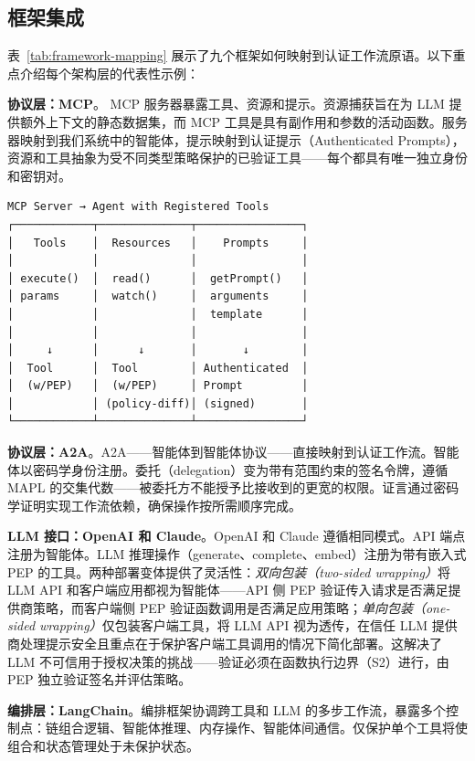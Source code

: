 \subsection{框架集成}
表~\ref{tab:framework-mapping} 展示了九个框架如何映射到认证工作流原语。以下重点介绍每个架构层的代表性示例：


\textbf{协议层：MCP}。
MCP 服务器暴露工具、资源和提示。资源捕获旨在为 LLM 提供额外上下文的静态数据集，而 MCP 工具是具有副作用和参数的活动函数。服务器映射到我们系统中的智能体，提示映射到认证提示（Authenticated Prompts）\cite{rajagopalan2025prompts}，资源和工具抽象为受不同类型策略保护的已验证工具——每个都具有唯一独立身份和密钥对。

\noindent\begin{minipage}[t]{\columnwidth}
{\scriptsize
\begin{verbatim}
MCP Server → Agent with Registered Tools
┌────────────┬──────────────┬────────────────┐
│   Tools    │  Resources   │    Prompts     │
│            │              │                │
│ execute()  │  read()      │  getPrompt()   │
│ params     │  watch()     │  arguments     │
│            │              │  template      │
│            │              │                │
│     ↓      │      ↓       │       ↓        │
│  Tool      │  Tool        │ Authenticated  │
│  (w/PEP)   │  (w/PEP)     │ Prompt         │
│            │ (policy-diff)│ (signed)       │
└────────────┴──────────────┴────────────────┘
\end{verbatim}}
\end{minipage}


\textbf{协议层：A2A}。A2A——智能体到智能体协议——直接映射到认证工作流。智能体以密码学身份注册。委托（delegation）变为带有范围约束的签名令牌，遵循 MAPL 的交集代数——被委托方不能授予比接收到的更宽的权限。证言通过密码学证明实现工作流依赖，确保操作按所需顺序完成。

\textbf{LLM 接口：OpenAI 和 Claude}。OpenAI 和 Claude 遵循相同模式。API 端点注册为智能体。LLM 推理操作（generate、complete、embed）注册为带有嵌入式 PEP 的工具。两种部署变体提供了灵活性：\textit{双向包装（two-sided wrapping）}将 LLM API 和客户端应用都视为智能体——API 侧 PEP 验证传入请求是否满足提供商策略，而客户端侧 PEP 验证函数调用是否满足应用策略；\textit{单向包装（one-sided wrapping）}仅包装客户端工具，将 LLM API 视为透传，在信任 LLM 提供商处理提示安全且重点在于保护客户端工具调用的情况下简化部署。这解决了 LLM 不可信用于授权决策的挑战——验证必须在函数执行边界（S2）进行，由 PEP 独立验证签名并评估策略。

\textbf{编排层：LangChain}。编排框架协调跨工具和 LLM 的多步工作流，暴露多个控制点：链组合逻辑、智能体推理、内存操作、智能体间通信。仅保护单个工具将使组合和状态管理处于未保护状态。


